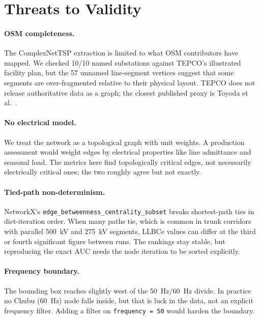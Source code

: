 \documentclass[11pt,a4paper]{article}
\begin{document}
\section{Threats to Validity}
\label{sec:validity}

\paragraph{OSM completeness.}
The ComplexNetTSP extraction is limited to what OSM contributors have
mapped. We checked \num{10}/\num{10} named substations against TEPCO's
illustrated facility plan, but the \num{57} unnamed line-segment vertices
suggest that some segments are over-fragmented relative to their physical
layout. TEPCO does not release authoritative data as a graph; the
closest published proxy is Toyoda et al.~\cite{toyoda2008japan}.

\paragraph{No electrical model.}
We treat the network as a topological graph with unit weights. A
production assessment would weight edges by electrical properties like
line admittance and seasonal load. The metrics here find topologically critical edges,
not necessarily electrically critical ones; the two roughly agree but
not exactly.

\paragraph{Tied-path non-determinism.}
NetworkX's \texttt{edge\_betweenness\_centrality\_subset} breaks
shortest-path ties in dict-iteration order. When many paths tie, which is
common in trunk corridors with parallel \SI{500}{\kilo\volt} and
\SI{275}{\kilo\volt} segments, LLBCe values can differ at the third or
fourth significant figure between runs. The rankings stay stable, but
reproducing the exact AUC needs the node iteration to be sorted
explicitly.

\paragraph{Frequency boundary.}
The bounding box reaches slightly west of the \SI{50}{\hertz}/\SI{60}{\hertz}
divide. In practice no Chubu (\SI{60}{\hertz}) node falls inside, but
that is luck in the data, not an explicit frequency filter. Adding a
filter on \texttt{frequency = 50} would harden the boundary.
\end{document}
